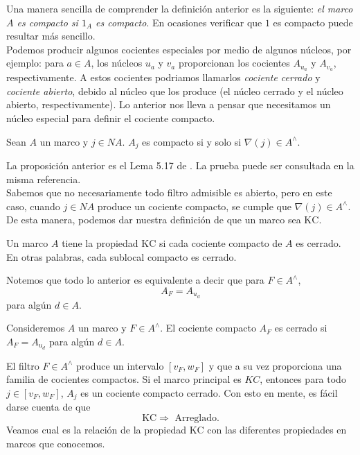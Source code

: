 Una manera sencilla de comprender la definición anterior es la siguiente: \emph{el marco $A$ es compacto si $1_A$ es compacto}. En ocasiones verificar que $1$ es compacto puede resultar más sencillo.\\

Podemos producir algunos cocientes especiales por medio de algunos núcleos, por ejemplo: para $a\in A$, los núcleos $u_a$ y $v_a$ proporcionan los cocientes $A_{u_a}$ y $A_{v_a}$, respectivamente. A estos cocientes podriamos llamarlos \emph{cociente cerrado} y \emph{cociente abierto}, debido al núcleo que los produce (el núcleo cerrado y el núcleo abierto, respectivamente). 
Lo anterior nos lleva a pensar que necesitamos un núcleo especial para definir el cociente compacto. 

\begin{prop}\label{cocientecompacto}
Sean $A$ un marco y $j\in NA$. $A_j$ es compacto si y solo si $\nabla(j)\in A^\wedge$.
\end{prop}

La proposición anterior es el Lema 5.17 de \cite{R.S.2}. La prueba puede ser consultada en la misma referencia.\\

Sabemos que no necesariamente todo filtro admisible es abierto, pero en este caso, cuando $j\in NA$ produce un cociente compacto, se cumple que $\nabla(j)\in A^\wedge$.\\

De esta manera, podemos dar nuestra definición de que un marco sea $\mathrm{KC}$.

\begin{dfn}\label{KOMPACT}
	Un marco $A$ tiene la propiedad $\mathrm{KC}$ si cada cociente compacto de $A$ es cerrado. En otras palabras, cada sublocal compacto es cerrado.
\end{dfn}

Notemos que todo lo anterior es equivalente a decir que para $F\in A^\wedge$,
\[
A_F=A_{u_d}
\]
para algún $d\in A$.

\begin{dfn}\label{ccquotien}
    Consideremos $A$ un marco y $F\in A^\wedge$. El cociente compacto $A_F$ es cerrado si $A_F=A_{u_d}$ para algún $d\in A$.
\end{dfn}

El filtro $F\in A^\wedge$ produce un intervalo $[v_F, w_F]$ y que a su vez proporciona una familia de cocientes compactos. Si el marco principal es $KC$, entonces para todo $j\in [v_F, w_F]$, $A_j$ es un cociente compacto cerrado. Con esto en mente, es fácil darse cuenta de que 
\[
\mathrm{KC} \Rightarrow \mbox{ Arreglado}.
\]
Veamos cual es la relación de la propiedad $\mathrm{KC}$ con las diferentes propiedades en marcos que conocemos.\\

